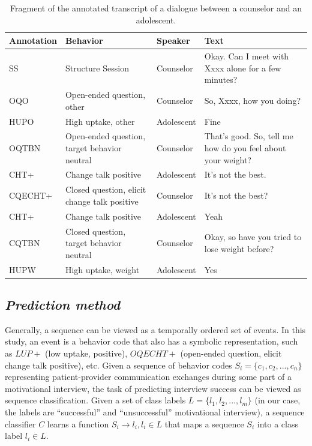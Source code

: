 \documentclass{amia_summit_2018}
\begin{document}
\begin{table}[h]
\caption{Fragment of the annotated transcript of a dialogue between a counselor and an adolescent.}    
\label{tab:anno_examp}
\centering
\begin{tabular}{|l|p{3.2cm}|l|p{8cm}|}
\hline
\bf{Annotation}  & \bf{Behavior} & \bf{Speaker} & \bf{Text} \\\hline
SS & Structure Session & Counselor & Okay. Can I meet with Xxxx alone for a few minutes? \\\hline
OQO & Open-ended question, other & Counselor & So, Xxxx, how you doing? \\\hline
HUPO &    High uptake, other    & Adolescent &    Fine \\\hline
OQTBN &    Open-ended question, target behavior neutral & Counselor &    That's good.  So, tell me  how do you feel about your weight? \\\hline
CHT+ &    Change talk positive    & Adolescent &    It's not the best. \\\hline
CQECHT+ & Closed question, elicit change talk positive & Counselor & It's not the best? \\\hline
CHT+ &    Change talk positive &    Adolescent & Yeah \\\hline
CQTBN &    Closed question, target behavior neutral  & Counselor &    Okay, so have you tried to lose weight before? \\\hline
HUPW &    High uptake, weight & Adolescent &    Yes \\\hline
\end{tabular}
\end{table}  

\subsection*{\textit{Prediction method}}
Generally, a sequence can be viewed as a temporally ordered set of events. In this study, an event is a behavior code that also has a symbolic representation, such as $LUP+$ (low uptake, positive),
$OQECHT+$ (open-ended question, elicit change talk positive), etc.  Given a sequence of behavior codes $S_i = \{c_1, c_2,...,c_n\}$ representing patient-provider communication exchanges during some
part of a motivational interview, the task of predicting interview success can be viewed as sequence classification. Given a set of class labels $L = \{l_1, l_2,...,l_m\}$ (in our case, the labels are
``successful'' and ``unsuccessful'' motivational interview), a sequence classifier $C$ learns a function $S_i \to l_i, l_i \in L$ that maps a sequence $S_i$ into a class label $l_i \in L$.
\end{document}
